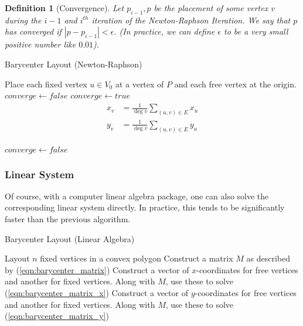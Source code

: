 \documentclass[11pt]{report}
\newcommand{\abs}[1]{\left|#1\right|}
\newtheorem{defn}{Definition}[section]
\begin{document}
\begin{defn}[Convergence]
    Let $p_{i - 1}, p$ be the placement of some vertex $v$ during the $i - 1$ and $i^{th}$ iteration of the Newton-Raphson Iteration. We say that $p$ has converged if $\abs{p - p_{i - 1}} < \epsilon$. (In practice, we can define $\epsilon$ to be a very small positive number like $0.01$).
\end{defn}

\begin{algorithm}[H]
    \caption{Barycenter Layout (Newton-Raphson)}
    \begin{algorithmic}[1]
        \State Place each fixed vertex $u \in V_0$ at a vertex of $P$ and each free vertex at the origin.
        \State $converge \gets false$
            \State $converge \gets true$
                \[
                \begin{aligned}
                x_v &= \frac{1}{\deg{v}} \sum_{(u, v) \in E} x_u \\
                y_v &= \frac{1}{\deg{v}} \sum_{(u, v) \in E} y_u \\
                \end{aligned}
                \]
                
                \State {}
                    \State $converge \gets false$
                \EndIf
            \EndFor
        \EndWhile
        \EndProcedure
    \end{algorithmic}
\end{algorithm}

\subsubsection{Linear System}
Of course, with a computer linear algebra package, one can also solve the corresponding linear system directly. In practice, this tends to be significantly faster than the previous algorithm.

\begin{algorithm}[H]
    \caption{Barycenter Layout (Linear Algebra)}\label{barycenter_la}
    \begin{algorithmic}[1]       
        \State Layout $n$ fixed vertices in a convex polygon
        \State Construct a matrix $M$ as described by (\ref{eqn:barycenter_matrix})
        \State Construct a vector of $x$-coordinates for free vertices and another for fixed vertices. Along with $M$, use these to solve (\ref{eqn:barycenter_matrix_x})
        \State Construct a vector of $y$-coordinates for free vertices and another for fixed vertices. Along with $M$, use these to solve (\ref{eqn:barycenter_matrix_y})
        \EndProcedure
    \end{algorithmic}
\end{algorithm}
\end{document}
